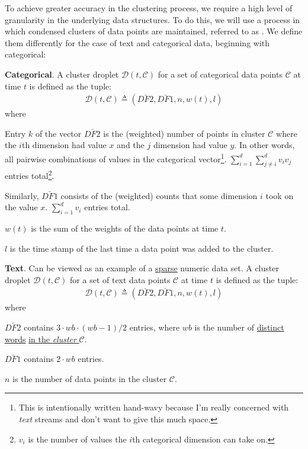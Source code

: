 \documentclass[11pt]{article}
\newcommand\p{\Needspace{10\baselineskip} \noindent}
\begin{document}
\p To achieve greater accuracy in the clustering process, we require a high level of granularity in the underlying data structures. To do this, we will use a process in which condensed clusters of data points are maintained, referred to as . We define them differently for the case of text and categorical data, beginning with categorical:
\begin{compactitem}
	\item \textbf{Categorical}. A cluster droplet $\mathcal{D}(t, \mathcal{C})$ for a set of
	categorical data points $\mathcal{C}$ at time $t$ is defined as the tuple:
	\begin{align}
		\mathcal{D}(t, \mathcal{C}) \triangleq (\bar{DF2},  \bar{DF1}, n, w(t), l)
	\end{align}
	where
	\begin{compactitem}
		\item Entry $k$ of the vector $\bar{DF2}$ is the (weighted) number of points in cluster $\mathcal{C}$ where the $i$th dimension had value $x$ and the $j$ dimension had value $y$. In other words, all pairwise combinations of values in the categorical vector\footnote{This is intentionally written hand-wavy because I'm really concerned with \textit{text} streams and don't want to give this much space.}. $\sum_{i = 1}^{d} \sum_{j \ne i}^{d} v_i v_j$ entries total\footnote{$v_i$ is the number of values the $i$th categorical dimension can take on.}.
		
		\item Similarly, $\bar{DF1}$ consists of the (weighted) counts that some dimension $i$ took on the value $x$. $\sum_{i = 1}^{d}v_i $ entries total.
		
		\item $w(t)$ is the sum of the weights of the data points at time $t$. 
		
		\item $l$ is the time stamp of the last time a data point was added to the cluster.
	\end{compactitem}
	
	
	\item \textbf{Text}. Can be viewed as an example of a \underline{sparse} numeric data set.  A cluster droplet $\mathcal{D}(t, \mathcal{C})$ for a set of text data points $\mathcal{C}$ at time $t$ is defined as the tuple:
	\begin{align}
	\mathcal{D}(t, \mathcal{C}) \triangleq (\bar{DF2},  \bar{DF1}, n, w(t), l)
	\end{align}
	where
	\begin{compactitem}
		\item $\bar{DF2}$ contains $3 \cdot wb \cdot (wb - 1) / 2$ entries, where $wb$ is the number of \underline{distinct words} \underline{in the \textit{cluster} $\mathcal{C}$}.
		
		\item $\bar{DF1}$ contains $2 \cdot wb$ entries.
		
		\item $n$ is the number of data points in the cluster $\mathcal{C}$. 
	\end{compactitem}
\end{compactitem}
\end{document}
